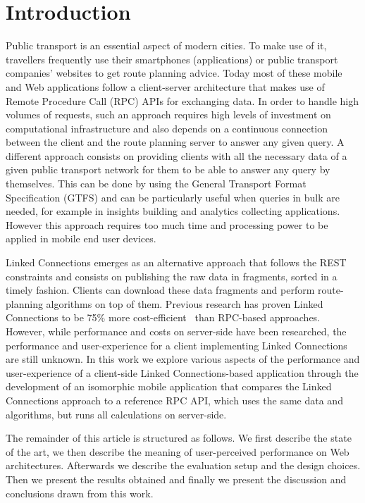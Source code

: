 \documentclass[twocolumn]{phdsymp} %
\begin{document}
\section{Introduction}
 Public transport is an essential aspect of modern cities. To make use of it, travellers frequently use their smartphones (applications) or public transport companies' websites to get route planning advice. Today most of these mobile and Web applications follow a client-server architecture that makes use of Remote Procedure Call (RPC) APIs for exchanging data. In order to handle high volumes of requests, such an approach requires high levels of investment on computational infrastructure and also depends on a continuous connection between the client and the route planning server to answer any given query. A different approach consists on providing clients with all the necessary data of a given public transport network for them to be able to answer any query by themselves. This can be done by using the General Transport Format Specification (GTFS) and can be particularly useful when queries in bulk are needed, for example in insights building and analytics collecting applications. However this approach requires too much time and processing power to be applied in mobile end user devices.

Linked Connections emerges as an alternative approach that follows the REST constraints and consists on publishing the raw data in fragments, sorted in a timely fashion. Clients can download these data fragments and perform route-planning algorithms on top of them. Previous research has proven Linked Connections to be 75\% more cost-efficient~\cite{colpaert17} than RPC-based approaches. However, while performance and costs on server-side have been researched, the performance and user-experience for a client implementing Linked Connections are still unknown. In this work we explore various aspects of the performance and user-experience of a client-side Linked Connections-based application through the development of an isomorphic mobile application that compares the Linked Connections approach to a reference RPC API, which uses the same data and algorithms, but runs all calculations on server-side.

The remainder of this article is structured as follows. We first describe the state of the art, we then describe the meaning of user-perceived performance on Web architectures. Afterwards we describe the evaluation setup and the design choices. Then we present the results obtained and finally we present the discussion and conclusions drawn from this work.
\end{document}
